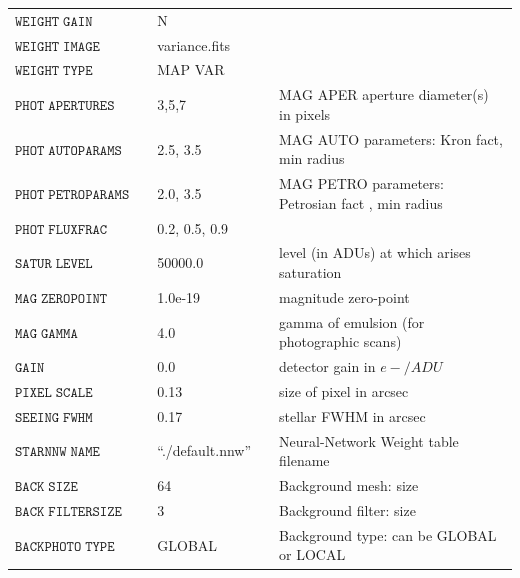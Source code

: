 \begin{table}
\begin{center}
\begin{tabular}{@{}lllll}
  $\mathtt{WEIGHT \; GAIN}$ & & N & &   \\
  $\mathtt{WEIGHT \; IMAGE}$ & & variance.fits & &  \\
  $\mathtt{WEIGHT \; TYPE}$ & & MAP VAR & &  \\
  $\mathtt{PHOT \; APERTURES}$ & & 3,5,7 & &  MAG APER aperture diameter(s) in pixels \\
  $\mathtt{PHOT \; AUTOPARAMS}$ & & 2.5, 3.5 & &  MAG AUTO parameters: Kron fact, min radius \\
  $\mathtt{PHOT \; PETROPARAMS}$ & & 2.0, 3.5 & &  MAG PETRO parameters: Petrosian fact , min radius \\
  $\mathtt{PHOT \; FLUXFRAC}$ & & 0.2, 0.5, 0.9 & &   \\
  $\mathtt{SATUR \; LEVEL}$ & & 50000.0 & &  level (in ADUs) at which arises saturation \\
  $\mathtt{MAG \; ZEROPOINT}$ & & 1.0e-19  & &  magnitude zero-point \\
  $\mathtt{MAG \; GAMMA}$ & & 4.0 & &  gamma of emulsion (for photographic scans) \\
  $\mathtt{GAIN}$ & & 0.0 & &  detector gain in $e-/ADU$ \\
  $\mathtt{PIXEL \; SCALE}$ & & 0.13 & &  size of pixel in arcsec\\
  $\mathtt{SEEING \; FWHM}$ & & 0.17 & &  stellar FWHM in arcsec \\
  $\mathtt{STARNNW \; NAME}$ & & ``./default.nnw'' & &  Neural-Network Weight table filename \\
  $\mathtt{BACK \; SIZE}$ & & 64 & &  Background mesh: size \\
  $\mathtt{BACK \; FILTERSIZE}$ & & 3 & &  Background filter: size \\
  $\mathtt{BACKPHOTO \; TYPE}$ & & GLOBAL & &  Background type: can be GLOBAL or LOCAL \\
 \hline
  \end{tabular}
\end{center}
\end{table}

